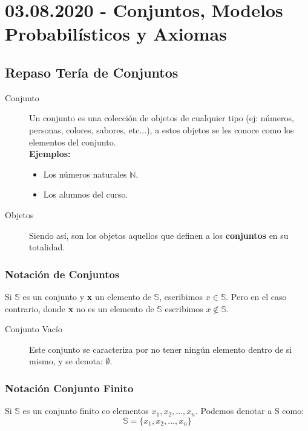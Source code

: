 \documentclass[a4paper,dvipsnames]{book}
\begin{document}
    \section{03.08.2020 - Conjuntos, Modelos Probabilísticos y Axiomas}


    \subsection{Repaso Tería de Conjuntos}


    \begin{description}
        \item[Conjunto] Un conjunto es una colección de objetos de cualquier
            tipo (ej: números, personas, colores, sabores, etc...), a estos
            objetos se les  conoce como los elementos del conjunto.\\
            \textbf{Ejemplos:}
            \begin{itemize}
                \item Los números naturales $\mathbb N$.
                \item Los alumnos del curso.
            \end{itemize}
        \item[Objetos] Siendo así, son los objetos aquellos que definen a los
            \textbf{conjuntos} en su totalidad.
    \end{description}
    \subsubsection{Notación de Conjuntos}


        Si $\mathbb S$ es un conjunto y \textbf{x} un elemento de $\mathbb S$,
        escribimos $x\in \mathbb S$. Pero en el caso contrario, donde
        \textbf{x} no es un elemento de $\mathbb S$ escribimos $x\notin \mathbb
        S$.

    \begin{description}
        \item[Conjunto Vacío] Este conjunto se caracteriza por no tener ningún
            elemento dentro de si mismo, y se denota: $\emptyset$.
    \end{description}

    \subsubsection{Notación Conjunto Finito}


        Si $ \mathbb S $ es un conjunto finito co elementos $ x_1,x_2,...,x_n
        $. Podemos denotar a S como:
        \begin{equation*}

            \mathbb S = \{x_1,x_2,...,x_n\}
        \end{equation*}
\end{document}
